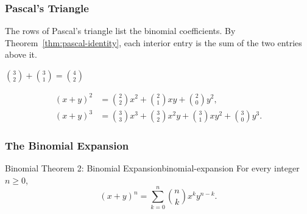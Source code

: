 \subsubsection{Pascal's Triangle}

The rows of Pascal's triangle list the binomial coefficients. By Theorem~\ref{thm:pascal-identity}, each interior entry is the sum of the two entries above it.

\begin{center}
  \qquad
  \qquad
  $\displaystyle\binom{3}{2}+\binom{3}{1}=\binom{4}{2}$
\end{center}

\begin{example}
  \begin{align*}
    (x+y)^2 & = \binom{2}{2}x^2+\binom{2}{1}xy+\binom{2}{0}y^2,                    \\
    (x+y)^3 & = \binom{3}{3}x^3+\binom{3}{2}x^2y+\binom{3}{1}xy^2+\binom{3}{0}y^3.
  \end{align*}
\end{example}

\subsubsection{The Binomial Expansion}

\begin{theorem}{Binomial Theorem 2: Binomial Expansion}{binomial-expansion}
  For every integer $n\ge0$,
  \[
    (x+y)^n=\sum_{k=0}^n\binom{n}{k}x^k y^{n-k}.
  \]
\end{theorem}

